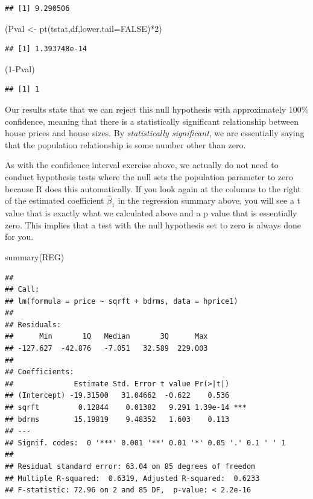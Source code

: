 \documentclass[
]{book}
\newenvironment{Shaded}{\begin{snugshade}}{\end{snugshade}}
\newcommand{\AttributeTok}[1]{\textcolor[rgb]{0.77,0.63,0.00}{#1}}
\newcommand{\ConstantTok}[1]{\textcolor[rgb]{0.00,0.00,0.00}{#1}}
\newcommand{\DecValTok}[1]{\textcolor[rgb]{0.00,0.00,0.81}{#1}}
\newcommand{\FunctionTok}[1]{\textcolor[rgb]{0.00,0.00,0.00}{#1}}
\newcommand{\NormalTok}[1]{#1}
\newcommand{\OtherTok}[1]{\textcolor[rgb]{0.56,0.35,0.01}{#1}}
\newcommand{\SpecialCharTok}[1]{\textcolor[rgb]{0.00,0.00,0.00}{#1}}
\begin{document}
\begin{verbatim}
## [1] 9.290506
\end{verbatim}

\begin{Shaded}
\begin{Highlighting}[]
\NormalTok{(Pval }\OtherTok{\textless{}{-}} \FunctionTok{pt}\NormalTok{(tstat,df,}\AttributeTok{lower.tail=}\ConstantTok{FALSE}\NormalTok{)}\SpecialCharTok{*}\DecValTok{2}\NormalTok{)}
\end{Highlighting}
\end{Shaded}

\begin{verbatim}
## [1] 1.393748e-14
\end{verbatim}

\begin{Shaded}
\begin{Highlighting}[]
\NormalTok{(}\DecValTok{1}\SpecialCharTok{{-}}\NormalTok{Pval)}
\end{Highlighting}
\end{Shaded}

\begin{verbatim}
## [1] 1
\end{verbatim}

Our results state that we can reject this null hypothesis with approximately 100\% confidence, meaning that there is a statistically significant relationship between house prices and house sizes. By \emph{statistically significant}, we are essentially saying that the population relationship is some number other than zero.

As with the confidence interval exercise above, we actually do not need to conduct hypothesis tests where the null sets the population parameter to zero because R does this automatically. If you look again at the columns to the right of the estimated coefficient \(\hat{\beta}_1\) in the regression summary above, you will see a t value that is exactly what we calculated above and a p value that is essentially zero. This implies that a test with the null hypothesis set to zero is always done for you.

\begin{Shaded}
\begin{Highlighting}[]
\FunctionTok{summary}\NormalTok{(REG)}
\end{Highlighting}
\end{Shaded}

\begin{verbatim}
## 
## Call:
## lm(formula = price ~ sqrft + bdrms, data = hprice1)
## 
## Residuals:
##      Min       1Q   Median       3Q      Max 
## -127.627  -42.876   -7.051   32.589  229.003 
## 
## Coefficients:
##              Estimate Std. Error t value Pr(>|t|)    
## (Intercept) -19.31500   31.04662  -0.622    0.536    
## sqrft         0.12844    0.01382   9.291 1.39e-14 ***
## bdrms        15.19819    9.48352   1.603    0.113    
## ---
## Signif. codes:  0 '***' 0.001 '**' 0.01 '*' 0.05 '.' 0.1 ' ' 1
## 
## Residual standard error: 63.04 on 85 degrees of freedom
## Multiple R-squared:  0.6319, Adjusted R-squared:  0.6233 
## F-statistic: 72.96 on 2 and 85 DF,  p-value: < 2.2e-16
\end{verbatim}
\end{document}
